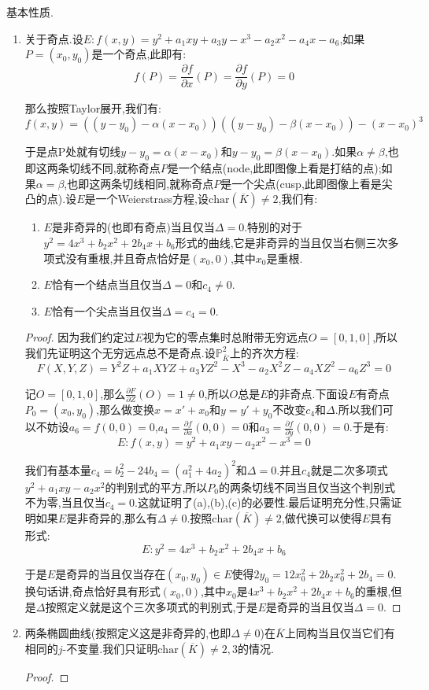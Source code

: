 基本性质.
\begin{enumerate}
	\item 关于奇点.设$E:f(x,y)=y^2+a_1xy+a_3y-x^3-a_2x^2-a_4x-a_6$,如果$P=(x_0,y_0)$是一个奇点,此即有:
	$$f(P)=\frac{\partial f}{\partial x}(P)=\frac{\partial f}{\partial y}(P)=0$$
	
	那么按照Taylor展开,我们有:
	$$f(x,y)=((y-y_0)-\alpha(x-x_0))((y-y_0)-\beta(x-x_0))-(x-x_0)^3$$
	
	于是点P处就有切线$y-y_0=\alpha(x-x_0)$和$y-y_0=\beta(x-x_0)$.如果$\alpha\not=\beta$,也即这两条切线不同,就称奇点$P$是一个结点(node,此即图像上看是打结的点);如果$\alpha=\beta$,也即这两条切线相同,就称奇点$P$是一个尖点(cusp,此即图像上看是尖凸的点).设$E$是一个Weierstrass方程,设$\mathrm{char}(\overline{K})\not=2$,我们有:
	\begin{enumerate}
		\item $E$是非奇异的(也即有奇点)当且仅当$\Delta=0$.特别的对于$y^2=4x^3+b_2x^2+2b_4x+b_6$形式的曲线,它是非奇异的当且仅当右侧三次多项式没有重根,并且奇点恰好是$(x_0,0)$,其中$x_0$是重根.
		\item $E$恰有一个结点当且仅当$\Delta=0$和$c_4\not=0$.
		\item $E$恰有一个尖点当且仅当$\Delta=c_4=0$.
	\end{enumerate}
	\begin{proof}
		
		因为我们约定过$E$视为它的零点集时总附带无穷远点$O=[0,1,0]$,所以我们先证明这个无穷远点总不是奇点.设$\mathbb{P}_{\overline{K}}^2$上的齐次方程:
		$$F(X,Y,Z)=Y^2Z+a_1XYZ+a_3YZ^2-X^3-a_2X^2Z-a_4XZ^2-a_6Z^3=0$$
		
		记$O=[0,1,0]$,那么$\frac{\partial F}{\partial Z}(O)=1\not=0$,所以$O$总是$E$的非奇点.下面设$E$有奇点$P_0=(x_0,y_0)$,那么做变换$x=x'+x_0$和$y=y'+y_0$不改变$c_4$和$\Delta$.所以我们可以不妨设$a_6=f(0,0)=0$,$a_4=\frac{\partial f}{\partial x}(0,0)=0$和$a_3=\frac{\partial f}{\partial y}(0,0)=0$.于是有:
		$$E:f(x,y)=y^2+a_1xy-a_2x^2-x^3=0$$
		
		我们有基本量$c_4=b_2^2-24b_4=(a_1^2+4a_2)^2$和$\Delta=0$.并且$c_4$就是二次多项式$y^2+a_1xy-a_2x^2$的判别式的平方,所以$P_0$的两条切线不同当且仅当这个判别式不为零,当且仅当$c_4=0$.这就证明了(a),(b),(c)的必要性.最后证明充分性,只需证明如果$E$是非奇异的,那么有$\Delta\not=0$.按照$\mathrm{char}(\overline{K})\not=2$,做代换可以使得$E$具有形式:
		$$E:y^2=4x^3+b_2x^2+2b_4x+b_6$$
		
		于是$E$是奇异的当且仅当存在$(x_0,y_0)\in E$使得$2y_0=12x_0^2+2b_2x_0^2+2b_4=0$.换句话讲,奇点恰好具有形式$(x_0,0)$,其中$x_0$是$4x^3+b_2x^2+2b_4x+b_6$的重根,但是$\Delta$按照定义就是这个三次多项式的判别式,于是$E$是奇异的当且仅当$\Delta=0$.
	\end{proof}
	\item 两条椭圆曲线(按照定义这是非奇异的,也即$\Delta\not=0$)在$\overline{K}$上同构当且仅当它们有相同的$j$-不变量.我们只证明$\mathrm{char}(\overline{K})\not=2,3$的情况.
	\begin{proof}
		

\end{proof}
\end{enumerate}
